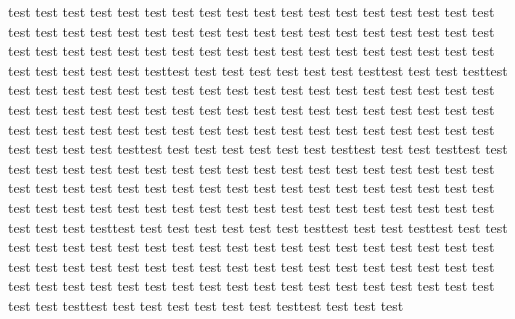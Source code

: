 test test test test test test test test test test test test test test test test test test test test test test test test test test test test test test test test test test test test test test test test test test test test test test test test test test test test test test test test test test test testtest test test test test test test testtest test test testtest test test test test test test test test test test test test test test test test test test test test test test test test test test test test test test test test test test test test test test test test test test test test test test test test test test test test test test test test test test testtest test test test test test test testtest test test testtest test test test test test test test test test test test test test test test test test test test test test test test test test test test test test test test test test test test test test test test test test test test test test test test test test test test test test test test test test test testtest test test test test test test testtest test test testtest test test test test test test test test test test test test test test test test test test test test test test test test test test test test test test test test test test test test test test test test test test test test test test test test test test test test test test test test test test testtest test test test test test test testtest test test test
